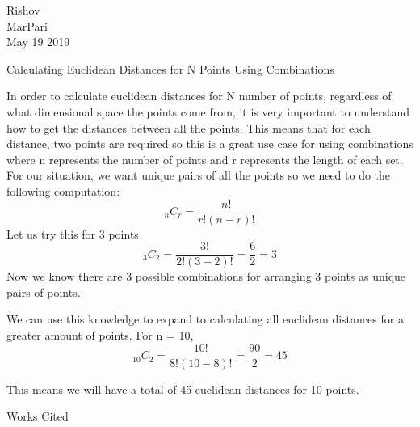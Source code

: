 \documentclass[12pt]{article}
\newenvironment{workscited}{\newpage \begin{center} Works Cited \end{center}}{\newpage }
\begin{document}
\begin{flushleft}

Rishov\\
MarPari\\
May 19 2019\\


\begin{center}
Calculating Euclidean Distances for N Points Using Combinations
\end{center}


\setlength{\parindent}{0.5in}
In order to calculate euclidean distances for N number of points, regardless of what  dimensional space the points come from, it is very important to understand how to get the distances between all the points. This means that for each distance, two points are required so this is a great use case for using combinations where n represents the number of points and r represents the length of each set. For our situation, we want unique pairs of all the points so we need to do the following computation:
$$ _nC_r = \frac{n!}{r!(n-r)!} $$
Let us try this for 3 points
$$ _3C_2 = \frac{3!}{2!(3-2)!} = \frac{6}{2} = 3 $$
Now we know there are 3 possible combinations for arranging 3 points as unique pairs of points.

We can use this knowledge to expand to calculating all euclidean distances for a greater amount of points.
For n = 10,
$$ _10C_2 = \frac{10!}{8!(10-8)!} = \frac{90}{2} = 45 $$

This means we will have a total of 45 euclidean distances for 10 points. 



\setlength{\parindent}{0.5in}


\begin{workscited}



\end{workscited}

\end{flushleft}
\end{document}
